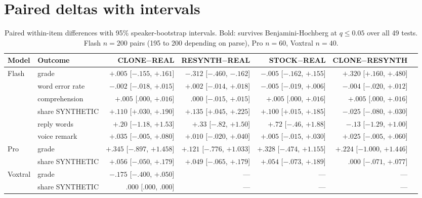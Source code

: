 \section{Paired deltas with intervals}
\label{app:tables}

\begin{table}[h]
\small
\centering
\setlength{\tabcolsep}{3pt}
\begin{tabular}{llrrrrr}
\toprule
Model & Outcome & CLONE$-$REAL & RESYNTH$-$REAL & STOCK$-$REAL & CLONE$-$RESYNTH \\
\midrule
Flash & grade & $+.005$ [$-.155$, $+.161$] & $\mathbf{-.312}$ [$-.460$, $-.162$] & $-.005$ [$-.162$, $+.155$] & $\mathbf{+.320}$ [$+.160$, $+.480$] \\
 & word error rate & $-.002$ [$-.018$, $+.015$] & $+.002$ [$-.014$, $+.018$] & $-.005$ [$-.019$, $+.006$] & $-.004$ [$-.020$, $+.012$] \\
 & comprehension & $+.005$ [$.000$, $+.016$] & $.000$ [$-.015$, $+.015$] & $+.005$ [$.000$, $+.016$] & $+.005$ [$.000$, $+.016$] \\
 & share SYNTHETIC & $+.110$ [$+.030$, $+.190$] & $+.135$ [$+.045$, $+.225$] & $+.100$ [$+.015$, $+.185$] & $-.025$ [$-.080$, $+.030$] \\
 & reply words & $+.20$ [$-1.18$, $+1.53$] & $+.33$ [$-.82$, $+1.50$] & $+.72$ [$-.46$, $+1.88$] & $-.13$ [$-1.29$, $+1.00$] \\
 & voice remark & $+.035$ [$-.005$, $+.080$] & $+.010$ [$-.020$, $+.040$] & $+.005$ [$-.015$, $+.030$] & $+.025$ [$-.005$, $+.060$] \\
\midrule
Pro & grade & $+.345$ [$-.897$, $+1.458$] & $+.121$ [$-.776$, $+1.033$] & $+.328$ [$-.474$, $+1.155$] & $+.224$ [$-1.000$, $+1.446$] \\
 & share SYNTHETIC & $+.056$ [$-.050$, $+.179$] & $+.049$ [$-.065$, $+.179$] & $+.054$ [$-.073$, $+.189$] & $.000$ [$-.071$, $+.077$] \\
\midrule
Voxtral & grade & $-.175$ [$-.400$, $+.050$] & --- & --- & --- \\
 & share SYNTHETIC & $.000$ [$.000$, $.000$] & --- & --- & --- \\
\bottomrule
\end{tabular}
\caption{Paired within-item differences with 95\% speaker-bootstrap intervals. Bold: survives Benjamini-Hochberg at $q \le 0.05$ over all 49 tests. Flash $n = 200$ pairs (195 to 200 depending on parse), Pro $n = 60$, Voxtral $n = 40$.}
\label{tab:deltas}
\end{table}

